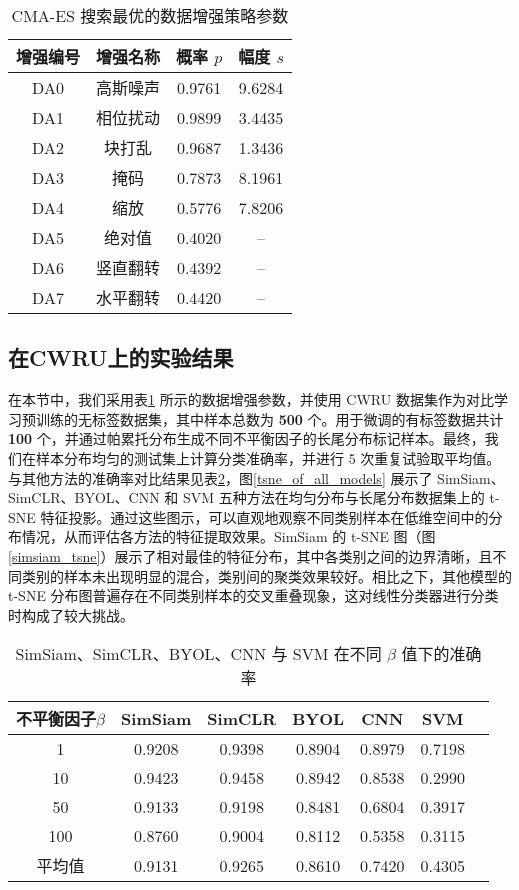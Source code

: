 \documentclass[master]{thesis-uestc}
\begin{document}
\begin{table}
    \caption{CMA-ES 搜索最优的数据增强策略参数}
    \centering
    \begin{tabular}{cccc}
    \toprule
    增强编号 & 增强名称 & 概率 $p$ & 幅度 $s$\\
    \midrule
    DA0 & 高斯噪声 & 0.9761 & 9.6284 \\
    DA1 & 相位扰动 & 0.9899 & 3.4435 \\
    DA2 & 块打乱 & 0.9687 & 1.3436 \\
    DA3 & 掩码 & 0.7873 & 8.1961 \\
    DA4 & 缩放 & 0.5776 & 7.8206 \\
    DA5 & 绝对值 & 0.4020 & -- \\
    DA6 & 竖直翻转 & 0.4392 & -- \\
    DA7 & 水平翻转 & 0.4420 & -- \\
    \bottomrule
    \end{tabular}
    \label{CMA-ES_solution}
\end{table}

\subsection{在CWRU上的实验结果}
\label{simsiam_cwru_results}
在本节中，我们采用表\ref{CMA-ES_solution} 所示的数据增强参数，并使用 CWRU 数据集作为对比学习预训练的无标签数据集，其中样本总数为 \textbf{500} 个。用于微调的有标签数据共计 \textbf{100} 个，并通过帕累托分布生成不同不平衡因子的长尾分布标记样本。最终，我们在样本分布均匀的测试集上计算分类准确率，并进行 5 次重复试验取平均值。与其他方法的准确率对比结果见表\ref{simsiam_simclr_byol_cnn_svm_results}，图\ref{tsne_of_all_models} 展示了 SimSiam、SimCLR、BYOL、CNN 和 SVM 五种方法在均匀分布与长尾分布数据集上的 t-SNE 特征投影。通过这些图示，可以直观地观察不同类别样本在低维空间中的分布情况，从而评估各方法的特征提取效果。SimSiam 的 t-SNE 图（图\ref{simsiam_tsne}）展示了相对最佳的特征分布，其中各类别之间的边界清晰，且不同类别的样本未出现明显的混合，类别间的聚类效果较好。相比之下，其他模型的 t-SNE 分布图普遍存在不同类别样本的交叉重叠现象，这对线性分类器进行分类时构成了较大挑战。

\begin{table}
    \caption{SimSiam、SimCLR、BYOL、CNN 与 SVM 在不同 $\beta$ 值下的准确率}
    \centering
    \begin{tabular}{ccccccc}
    \toprule
    不平衡因子$\beta$  & SimSiam & SimCLR & BYOL & CNN & SVM \\
    \midrule
    1   & 0.9208  & 0.9398 & 0.8904 & 0.8979 & 0.7198 \\
    10  & 0.9423  & 0.9458 & 0.8942 & 0.8538 & 0.2990 \\
    50  & 0.9133  & 0.9198 & 0.8481 & 0.6804 & 0.3917 \\
    100 & 0.8760  & 0.9004 & 0.8112 & 0.5358 & 0.3115 \\
    \midrule
    平均值 & 0.9131 & 0.9265 & 0.8610 & 0.7420 & 0.4305 \\
    \bottomrule
    \end{tabular}
    \label{simsiam_simclr_byol_cnn_svm_results}
\end{table}
\end{document}
